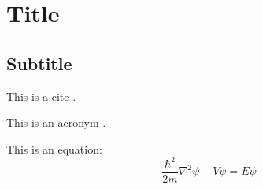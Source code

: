 \clearpage
\section{Title}
\lipsum[1-2] %
\subsection{Subtitle}
\lipsum[3-4] %

This is a cite \cite{Einstein1916}.

This is an acronym .

This is an equation:
\begin{equation}
   -\frac{\hbar^2}{2m}\nabla^2\psi + V\psi = E\psi
\end{equation}